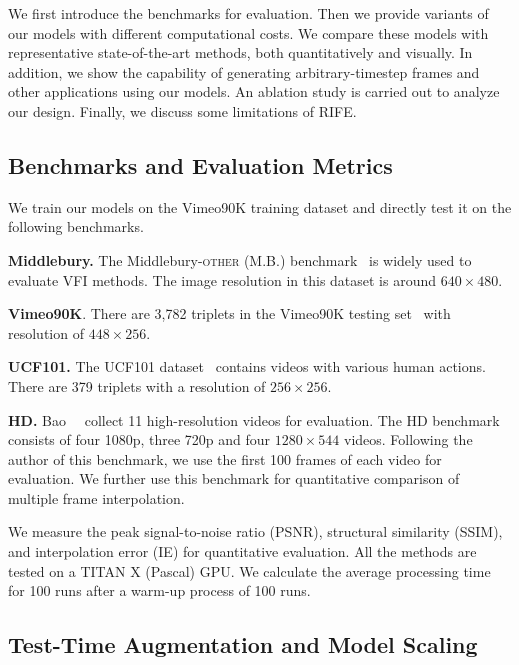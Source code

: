 \documentclass[final]{cvpr}
\begin{document}
We first introduce the benchmarks for evaluation. Then we provide variants of our models with different computational costs. We compare these models with representative state-of-the-art methods, both quantitatively and visually. In addition, we show the capability of generating arbitrary-timestep frames and other applications using our models. An ablation study is carried out to analyze our design. Finally, we discuss some limitations of RIFE.

\subsection{Benchmarks and Evaluation Metrics}
We train our models on the Vimeo90K training dataset and directly test it on the following benchmarks. 

\textbf{Middlebury.} The Middlebury-\textsc{other} (M.B.) benchmark~\cite{baker2011database} is widely used to evaluate VFI methods. The image resolution in this dataset is around $640 \times 480$. 

\textbf{Vimeo90K}.
There are 3,782 triplets in the Vimeo90K testing set~\cite{xue2019video} with resolution of $448 \times 256$.


\textbf{UCF101.}
The UCF101 dataset~\cite{soomro2012ucf101} contains videos with various human actions. There are 379 triplets with a resolution of $256 \times 256$.



\textbf{HD.}
Bao~\etal~\cite{bao2019memc} collect 11 high-resolution videos for evaluation. The HD benchmark consists of four 1080p, three 720p and four $1280 \times 544$ videos. Following the author of this benchmark, we use the first 100 frames of each video for evaluation. We further use this benchmark for quantitative comparison of multiple frame interpolation.

We measure the peak signal-to-noise ratio (PSNR), structural similarity (SSIM), and interpolation error (IE) for quantitative evaluation. All the methods are tested on a TITAN X (Pascal) GPU. We calculate the average processing time for 100 runs after a warm-up process of 100 runs. 



\subsection{Test-Time Augmentation and Model Scaling}
\label{sec:model_scaling}
\end{document}
